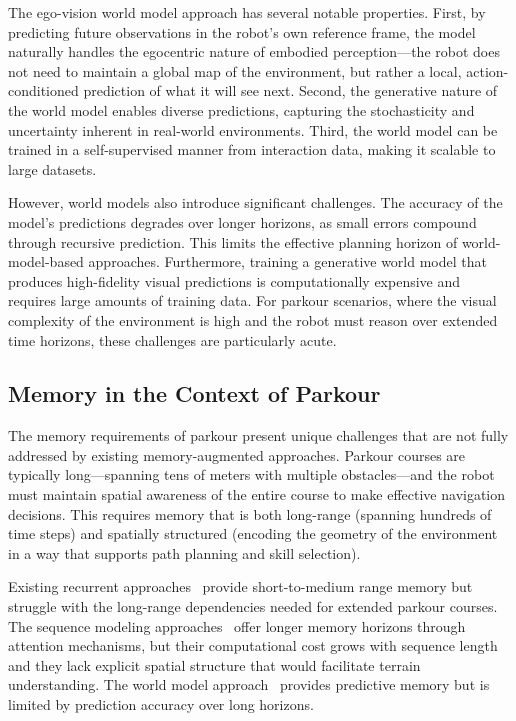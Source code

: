 The ego-vision world model approach has several notable properties. First, by predicting future observations in the robot's own reference frame, the model naturally handles the egocentric nature of embodied perception---the robot does not need to maintain a global map of the environment, but rather a local, action-conditioned prediction of what it will see next. Second, the generative nature of the world model enables diverse predictions, capturing the stochasticity and uncertainty inherent in real-world environments. Third, the world model can be trained in a self-supervised manner from interaction data, making it scalable to large datasets.

However, world models also introduce significant challenges. The accuracy of the model's predictions degrades over longer horizons, as small errors compound through recursive prediction. This limits the effective planning horizon of world-model-based approaches. Furthermore, training a generative world model that produces high-fidelity visual predictions is computationally expensive and requires large amounts of training data. For parkour scenarios, where the visual complexity of the environment is high and the robot must reason over extended time horizons, these challenges are particularly acute.

\subsection{Memory in the Context of Parkour}

The memory requirements of parkour present unique challenges that are not fully addressed by existing memory-augmented approaches. Parkour courses are typically long---spanning tens of meters with multiple obstacles---and the robot must maintain spatial awareness of the entire course to make effective navigation decisions. This requires memory that is both long-range (spanning hundreds of time steps) and spatially structured (encoding the geometry of the environment in a way that supports path planning and skill selection).

Existing recurrent approaches~\cite{zhang2024rpl,nahraendra2024dreamwaq} provide short-to-medium range memory but struggle with the long-range dependencies needed for extended parkour courses. The sequence modeling approaches~\cite{radosavovic2024nexttoken,liu2024locoformer} offer longer memory horizons through attention mechanisms, but their computational cost grows with sequence length and they lack explicit spatial structure that would facilitate terrain understanding. The world model approach~\cite{liu2024egovision1,liu2024egovision2} provides predictive memory but is limited by prediction accuracy over long horizons.

